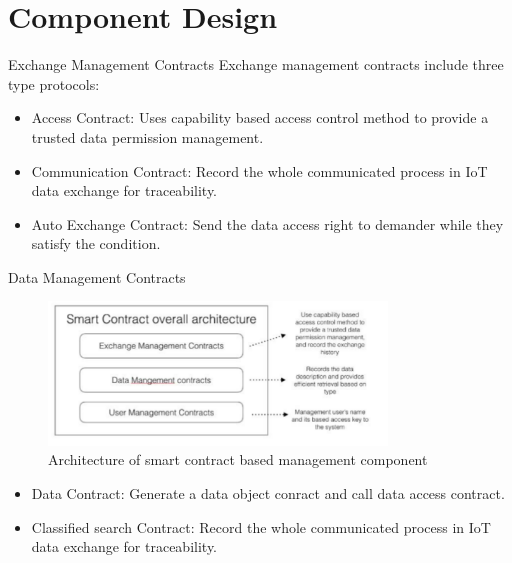\documentclass[10pt]{beamer}
\begin{document}
\section{Component Design}

\begin{frame}{Exchange Management Contracts}
	Exchange management contracts include three type protocols:
			\begin{itemize}
			\item Access Contract: Uses capability based access control method to provide a trusted data permission management. 
			\item Communication Contract: Record the whole communicated process in IoT data exchange for traceability.
			\item Auto Exchange Contract: Send the data access right to demander while they satisfy the condition.
			\end{itemize}
\end{frame}

\begin{frame}{Data Management Contracts}
	\begin{figure}  
	\includegraphics[width=9cm]{smatcontract_management}    
    \caption{Architecture of smart contract based management component}
    \end{figure}
    			\begin{itemize}
			\item Data Contract: Generate a data object conract and call data access contract.  
			\item Classified search Contract: Record the whole communicated process in IoT data exchange for traceability.
			\end{itemize}
\end{frame}
\end{document}
